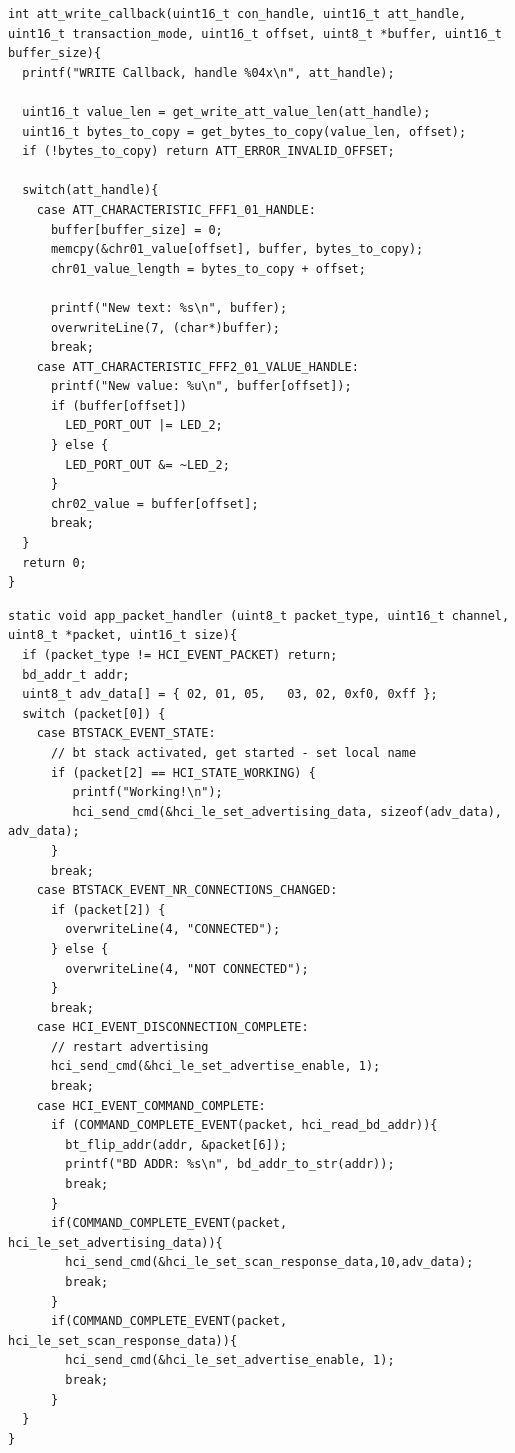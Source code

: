 \documentclass[a4paper,titlepage,oneside,12pt]{amsart} %
\begin{document}
\begin{lstlisting}[float, caption= Write callback ., label=code:lePeripheralWriteCallback]
int att_write_callback(uint16_t con_handle, uint16_t att_handle, uint16_t transaction_mode, uint16_t offset, uint8_t *buffer, uint16_t buffer_size){
  printf("WRITE Callback, handle %04x\n", att_handle);
  
  uint16_t value_len = get_write_att_value_len(att_handle);
  uint16_t bytes_to_copy = get_bytes_to_copy(value_len, offset);
  if (!bytes_to_copy) return ATT_ERROR_INVALID_OFFSET;
  
  switch(att_handle){
    case ATT_CHARACTERISTIC_FFF1_01_HANDLE:
      buffer[buffer_size] = 0;
      memcpy(&chr01_value[offset], buffer, bytes_to_copy);
      chr01_value_length = bytes_to_copy + offset;
      
      printf("New text: %s\n", buffer);
      overwriteLine(7, (char*)buffer);
      break;
    case ATT_CHARACTERISTIC_FFF2_01_VALUE_HANDLE:
      printf("New value: %u\n", buffer[offset]);
      if (buffer[offset])
        LED_PORT_OUT |= LED_2;
      } else {
        LED_PORT_OUT &= ~LED_2;
      }
      chr02_value = buffer[offset];
      break;
  }
  return 0;
}
\end{lstlisting}

\begin{lstlisting}[float, caption= Write callback ., label=code:lePeripheralATTPacketHandler]
static void app_packet_handler (uint8_t packet_type, uint16_t channel, uint8_t *packet, uint16_t size){
  if (packet_type != HCI_EVENT_PACKET) return;
  bd_addr_t addr;
  uint8_t adv_data[] = { 02, 01, 05,   03, 02, 0xf0, 0xff }; 
  switch (packet[0]) {
	case BTSTACK_EVENT_STATE:
	  // bt stack activated, get started - set local name
	  if (packet[2] == HCI_STATE_WORKING) {
         printf("Working!\n");
         hci_send_cmd(&hci_le_set_advertising_data, sizeof(adv_data), adv_data);
      }
      break;
    case BTSTACK_EVENT_NR_CONNECTIONS_CHANGED:
      if (packet[2]) {
        overwriteLine(4, "CONNECTED");
      } else {
        overwriteLine(4, "NOT CONNECTED");
      }
      break;
    case HCI_EVENT_DISCONNECTION_COMPLETE:
      // restart advertising
      hci_send_cmd(&hci_le_set_advertise_enable, 1);
      break;
    case HCI_EVENT_COMMAND_COMPLETE:
      if (COMMAND_COMPLETE_EVENT(packet, hci_read_bd_addr)){
        bt_flip_addr(addr, &packet[6]);
        printf("BD ADDR: %s\n", bd_addr_to_str(addr));
        break;
      }
      if(COMMAND_COMPLETE_EVENT(packet,   hci_le_set_advertising_data)){
        hci_send_cmd(&hci_le_set_scan_response_data,10,adv_data);
        break;
      }
      if(COMMAND_COMPLETE_EVENT(packet, hci_le_set_scan_response_data)){
        hci_send_cmd(&hci_le_set_advertise_enable, 1);
        break;
      }
  }
}
\end{lstlisting}
\end{document}
